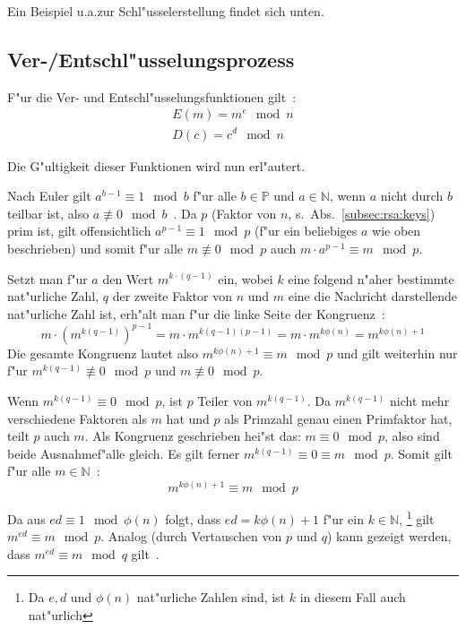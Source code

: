 \documentclass[12pt]{article}
\begin{document}
\noindent
Ein Beispiel u.a.\@ zur Schl"usselerstellung findet sich unten.

\subsection{Ver-/Entschl"usselungsprozess}
F"ur die Ver- und Entschl"usselungsfunktionen gilt~\cite{rsa}:
\[
\begin{aligned}
E(m) = m^e \mod n \\
D(c) = c^d \mod n
\end{aligned}
\]

\noindent
Die G"ultigkeit dieser Funktionen wird nun erl"autert.

Nach Euler gilt $a^{b-1} \equiv 1 \mod b$ f"ur alle $b \in \mathbb{P}$ und $a \in \mathbb{N}$,
wenn $a$ nicht durch $b$ teilbar ist, also $a \not\equiv 0 \mod b$~\cite{euler41}.
Da $p$ (Faktor von $n$, s.~Abs.~\ref{subsec:rsa:keys}) prim ist,
gilt offensichtlich $a^{p-1} \equiv 1 \mod p$
(f"ur ein beliebiges $a$ wie oben beschrieben) und somit f"ur alle $m \not\equiv 0 \mod p$ auch
$m \cdot a^{p-1} \equiv m \mod p$.

Setzt man f"ur $a$ den Wert $m^{k \cdot (q-1)}$ ein,
wobei $k$ eine folgend n"aher bestimmte nat"urliche Zahl, $q$ der zweite Faktor von $n$
und $m$ eine die Nachricht darstellende nat"urliche Zahl ist,
erh"alt man f"ur die linke Seite der Kongruenz~\cite{rsa}:
\[
    m \cdot \left(m^{k(q-1)}\right)^{p-1} = m \cdot m^{k(q-1)(p-1)} = m \cdot m^{k\phi(n)} = m^{k\phi(n) + 1}
\]
Die gesamte Kongruenz lautet also $m^{k\phi(n)+1} \equiv m \mod p$ und
gilt weiterhin nur f"ur $m^{k(q-1)} \not\equiv 0 \mod p$ und $m \not\equiv 0 \mod p$.

Wenn $m^{k(q-1)} \equiv 0 \mod p$, ist $p$ Teiler von $m^{k(q-1)}$.
Da $m^{k(q-1)}$ nicht mehr verschiedene Faktoren als $m$ hat und $p$ als Primzahl
genau einen Primfaktor hat, teilt $p$ auch $m$.
Als Kongruenz geschrieben hei"st das: $m \equiv 0 \mod p$, also sind beide Ausnahmef"alle gleich.
Es gilt ferner $m^{k(q-1)} \equiv 0 \equiv m \mod p$.
Somit gilt f"ur alle $m \in \mathbb{N}$~\cite{rsa}:
\[m^{k\phi(n)+1} \equiv m \mod p\]

Da aus $ed \equiv 1 \mod \phi(n)$ folgt, dass $ed = k\phi(n) +1$ f"ur ein $k \in \mathbb{N}$,%
\footnote{Da $e, d$ und $\phi(n)$ nat"urliche Zahlen sind, ist $k$ in diesem Fall auch nat"urlich}
gilt $m^{ed} \equiv m \mod p$.
Analog (durch Vertauschen von $p$ und $q$) kann gezeigt werden,
dass $m^{ed} \equiv m \mod q$ gilt~\cite{rsa}.
\end{document}
